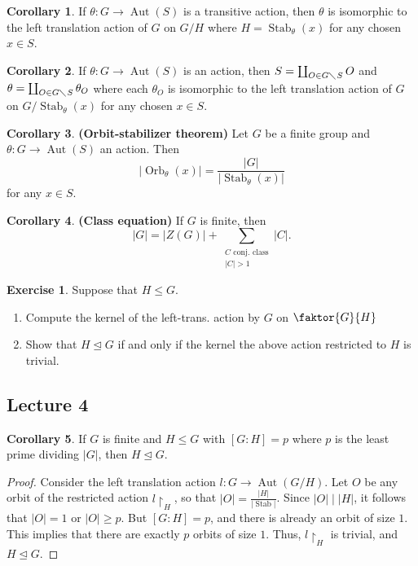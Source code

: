 \documentclass[10pt,letterpaper,cm]{nupset}
\theoremstyle{definition}
\newtheorem{corollary}{Corollary}
\newtheorem{exercise}{Exercise}
\newcommand{\1}{\mathbf{1}}
\newcommand{\0}{\vec 0}
\DeclareMathOperator{\aut}{Aut}
\DeclareMathOperator{\stab}{Stab}
\DeclareMathOperator{\orb}{Orb}
\begin{document}
\begin{corollary}
If $\theta : G \to \aut(S)$ is a transitive action, then $\theta$ is isomorphic to the left translation action of $G$ on $G/H$ where $H = \stab_{\theta}(x)$ for any chosen $x\in S$.
\end{corollary}

\begin{corollary}
If $\theta : G \to \aut(S)$ is an action, then $S = \coprod_{O \in G\diagdown S} O$ and $\theta = \coprod_{O \in G \diagdown S} \theta_O$ where each $\theta_O$ is isomorphic to the left translation action of $G$ on $G/\stab_{\theta}(x)$ for any chosen $x\in S$. 
\end{corollary}

\begin{corollary}{\textbf{(Orbit-stabilizer theorem)}}
Let $G$ be a finite group and $\theta : G \to \aut(S)$ an action. Then $$ \lvert{\orb_{\theta}(x)}\rvert = \frac{|G|}{\lvert{\stab_{\theta}(x)}\rvert}     $$ for any $x\in S$. 
\end{corollary}

\begin{corollary}{\textbf{(Class equation)}}
If $G$ is finite, then $$|G| = |Z(G)| + \sum_{{\substack{C \text{ conj. class} \\ |C| >1}}} |C|     .$$
\end{corollary}

\begin{exercise}{Suppose that $H \leq G$.}
\begin{enumerate}
\item Compute the kernel of the left-trans. action by $G$ on $\faktor{G}{H}$
\item Show that $H \unlhd G$  if and only if the kernel the above action restricted to $H$ is trivial. 
\end{enumerate}
\end{exercise}

\subsection{Lecture 4}

\begin{corollary} If $G$ is finite and $H\leq G$ with $[G:H] =p$ where $p$ is the least prime dividing $|G|$, then $H\unlhd G$.
\end{corollary}
\begin{proof}
Consider the left translation action $l : G \to \aut(G/H)$. Let $O$ be any orbit of the restricted action $l\restriction_H$, so that $|O| = \frac{|H|}{\lvert{\stab}\rvert}$. Since $|O| \mid |H|$, it follows that $|O|=1$ or $|O| \geq p$. But $[G:H] = p$, and there is already an orbit of size $1$. This implies that there are exactly $p$ orbits of size $1$. Thus, $l\restriction_H$ is trivial, and $H \unlhd G$.
\end{proof}
\end{document}

